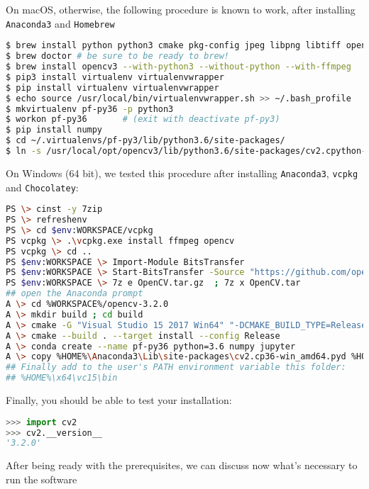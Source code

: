 \documentclass{article}
\def \pf{{\tt pf3 }}
\begin{document}
On macOS, otherwise, the following procedure is known to work, after installing \texttt{Anaconda3} and \texttt{Homebrew}
\begin{lstlisting}[language=bash, caption=Install on macOS]
$ brew install python python3 cmake pkg-config jpeg libpng libtiff openexr eigen tbb numpy
$ brew doctor # be sure to be ready to brew!
$ brew install opencv3 --with-python3 --without-python --with-ffmpeg
$ pip3 install virtualenv virtualenvwrapper
$ pip install virtualenv virtualenvwrapper
$ echo source /usr/local/bin/virtualenvwrapper.sh >> ~/.bash_profile
$ mkvirtualenv pf-py36 -p python3
$ workon pf-py36       # (exit with deactivate pf-py3)
$ pip install numpy
$ cd ~/.virtualenvs/pf-py3/lib/python3.6/site-packages/
$ ln -s /usr/local/opt/opencv3/lib/python3.6/site-packages/cv2.cpython-36m-darwin.so cv2.so
\end{lstlisting}

On Windows (64 bit), we tested this procedure after installing \texttt{Anaconda3}, \texttt{vcpkg} and \texttt{Chocolatey}:
\begin{lstlisting}[language=bash, caption=Install on Windows]
PS \> cinst -y 7zip
PS \> refreshenv
PS \> cd $env:WORKSPACE/vcpkg
PS vcpkg \> .\vcpkg.exe install ffmpeg opencv
PS vcpkg \> cd ..
PS $env:WORKSPACE \> Import-Module BitsTransfer
PS $env:WORKSPACE \> Start-BitsTransfer -Source "https://github.com/opencv/opencv/archive/3.2.0.tar.gz" -Destination "OpenCV.tar.gz"
PS $env:WORKSPACE \> 7z e OpenCV.tar.gz  ; 7z x OpenCV.tar
## open the Anaconda prompt
A \> cd %WORKSPACE%/opencv-3.2.0
A \> mkdir build ; cd build
A \> cmake -G "Visual Studio 15 2017 Win64" "-DCMAKE_BUILD_TYPE=Release" "-DWITH_CUDA=OFF" "-DCMAKE_TOOLCHAIN_FILE=%WORKSPACE%\vcpkg\scripts\buildsystems\vcpkg.cmake" "-DCMAKE_INSTALL_PREFIX=%HOME%" ..
A \> cmake --build . --target install --config Release
A \> conda create --name pf-py36 python=3.6 numpy jupyter
A \> copy %HOME%\Anaconda3\Lib\site-packages\cv2.cp36-win_amd64.pyd %HOME%\Anaconda3\envs\pf-py36\Lib\site-packages\cv2.pyd 
## Finally add to the user's PATH environment variable this folder:
## %HOME%\x64\vc15\bin
\end{lstlisting}

Finally, you should be able to test your installation:
\begin{lstlisting}[language=python, caption=Test]
>>> import cv2
>>> cv2.__version__
'3.2.0'
\end{lstlisting}

After being ready with the prerequisites, we can discuss now what's necessary to run the software
\end{document}
